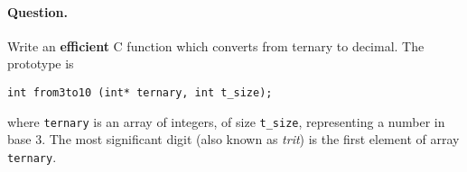 \paragraph{Question.} Write an \textbf{efficient} C function
  which converts from ternary to decimal. The prototype is
\begin{verbatim}
int from3to10 (int* ternary, int t_size);
\end{verbatim}
where \texttt{ternary} is an array of integers, of size
\texttt{t\_size}, representing a number in base \(3\). The most
significant digit (also known as \emph{trit}) is the first element of
array \texttt{ternary}.
